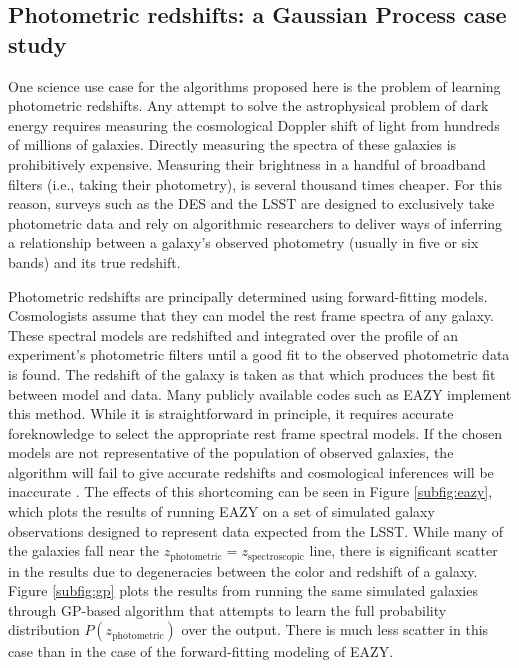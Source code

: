\documentclass[prd,nofootbib,floatfix,11pt,tightenlines]{revtex4}
\begin{document}
\subsection{Photometric redshifts: a Gaussian Process case study}
\label{sec:photoz}

One science use case for the algorithms proposed here is the problem of learning
photometric redshifts.  Any attempt to solve the astrophysical problem of dark
energy requires measuring the cosmological Doppler shift of light from hundreds of
millions of galaxies.  Directly measuring the spectra of these galaxies is
prohibitively expensive.  Measuring their brightness in a handful of broadband
filters (i.e., taking their photometry), is several thousand times cheaper. 
For this reason, surveys such as the DES and the LSST are designed to exclusively take
photometric data and rely on algorithmic researchers to deliver ways
of inferring a relationship between a galaxy's observed photometry (usually in five or
six bands) and its true redshift.

Photometric redshifts are principally determined using
forward-fitting models.  Cosmologists assume that they can model the rest frame
spectra of any galaxy.  These spectral models are
redshifted and integrated over the profile of an experiment's
photometric filters until a good fit to the observed photometric data is
found.  The redshift of the galaxy is taken as that which produces the best fit
between model and data.  Many publicly available codes such as 
EAZY \cite{eazy} implement this method.  
While it is straightforward in principle, it requires
accurate foreknowledge to select the appropriate rest frame 
spectral models.  If the chosen
models are not representative of the population of observed
galaxies, the algorithm will fail to give accurate redshifts and cosmological
inferences will be inaccurate \cite{budavari2008}.  The effects of this
shortcoming can be seen in Figure \ref{subfig:eazy}, which plots the results
of running EAZY on a set of
simulated galaxy observations designed to represent data expected from the
LSST.
While many of the galaxies fall near the
$z_\text{photometric}=z_\text{spectroscopic}$ line, there is significant scatter
in the results due to degeneracies between the color and redshift of a
galaxy.  Figure \ref{subfig:gp} plots the results from running the same
simulated galaxies through GP-based algorithm that attempts to learn the full
probability distribution $P(z_\text{photometric})$ over the output.  
There is much less scatter
in this case than in the case of the forward-fitting modeling of EAZY.
\end{document}
